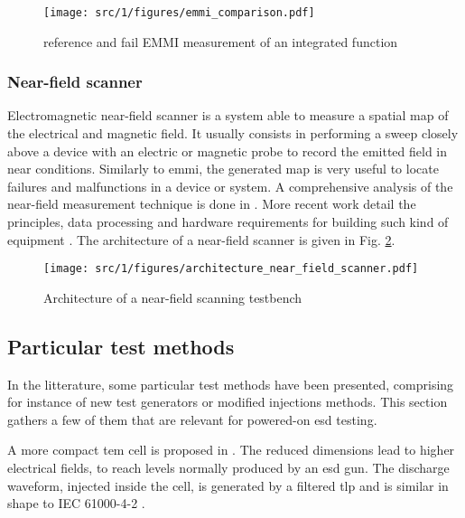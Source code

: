 \begin{figure}[!h]
  \centering
  \texttt{[image: src/1/figures/emmi\_comparison.pdf]}
  \caption{reference and fail EMMI measurement of an integrated function}
  \label{fig:emmi-examples}
\end{figure}


\subsubsection{Near-field scanner}

Electromagnetic near-field scanner is a system able to measure a spatial map of the electrical and magnetic field.
It usually consists in performing a sweep closely above a device with an electric or magnetic probe to record the emitted field in near conditions.
Similarly to \gls{emmi}, the generated map is very useful to locate failures and malfunctions in a device or system.
A comprehensive analysis of the near-field measurement technique is done in \cite{nfsFirstStudy}.
More recent work detail the principles, data processing and hardware requirements for building such kind of equipment \cite{planarNFSAntenna, NFSMeasurements, NFScanner}.
The architecture of a near-field scanner is given in Fig. \ref{fig:near-field-scanner}.

\begin{figure}[!h]
  \centering
  \texttt{[image: src/1/figures/architecture\_near\_field\_scanner.pdf]}
  \caption{Architecture of a near-field scanning testbench}
  \label{fig:near-field-scanner}
\end{figure}

\subsection{Particular test methods}

In the litterature, some particular test methods have been presented, comprising for instance of new test generators or modified injections methods.
This section gathers a few of them that are relevant for powered-on \gls{esd} testing.

A more compact \gls{tem} cell is proposed in \cite{SDRAMCase}.
The reduced dimensions lead to higher electrical fields, to reach levels normally produced by an \gls{esd} gun.
The discharge waveform, injected inside the cell, is generated by a filtered \gls{tlp} and is similar in shape to IEC 61000-4-2 \cite{iec61000-4-2}.

